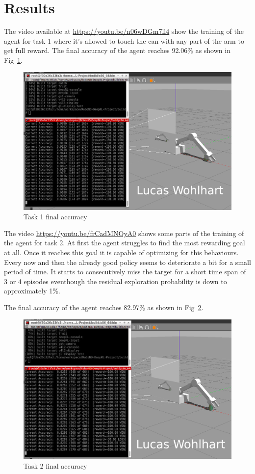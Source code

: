 \documentclass[10pt,journal,compsoc]{IEEEtran}
\begin{document}
\section{Results}  

The video available at \href{https://youtu.be/n06wDGm7ll4}{https://youtu.be/n06wDGm7ll4} show the training of the agent for task 1 where it's allowed to touch the can with any part of the arm to get full reward.
The final accuracy of the agent reaches 92.06\% as shown in Fig~\ref{fig:task1_final}.

\begin{figure}[thpb]
    \centering
    \includegraphics[width=0.85\linewidth]{img/task1_final.png}
    \caption{Task 1 final accuracy}
    \label{fig:task1_final}
\end{figure}

The video \href{https://youtu.be/frCadMNOyA0}{https://youtu.be/frCadMNOyA0} shows some parts of the training of the agent for task 2. At first the agent struggles to find the most rewarding goal at all. Once it reaches this goal it is capable of optimizing for this behaviours. Every now and then the already good policy seems to deteriorate a bit for a small period of time. It starts to consecutively miss the target for a short time span of 3 or 4 episodes eventhough the residual exploration probability is down to approximately 1\%.

The final accuracy of the agent reaches 82.97\% as shown in Fig~\ref{fig:task2_final}.


\begin{figure}[thpb]
    \centering
    \includegraphics[width=0.85\linewidth]{img/task2_final.png}
    \caption{Task 2 final accuracy}
    \label{fig:task2_final}
\end{figure}
\end{document}
